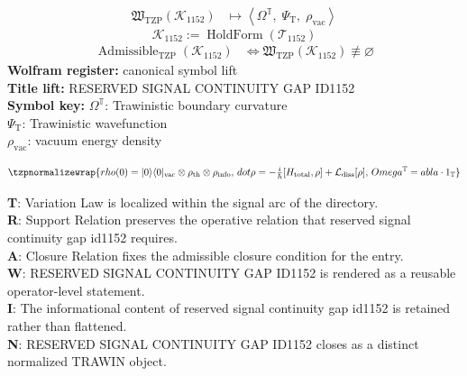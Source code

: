 \noindent
\begin{minipage}[t]{0.48\linewidth}
\begingroup
\small
\[
\begin{aligned}
\mathfrak{W}_{\mathrm{TZP}}\!\left(\mathcal{K}_{1152}\right)
&\longmapsto
\left\langle \Omega^{\mathbb{T}},\; \Psi_{\mathrm{T}},\; \rho_{\mathrm{vac}} \right\rangle
\end{aligned}
\]
\[
\mathcal{K}_{1152}
:=
\operatorname{HoldForm}\!\left(\mathcal{T}_{1152}\right)
\]
\[
\begin{aligned}
\operatorname{Admissible}_{\mathrm{TZP}}\!\left(\mathcal{K}_{1152}\right)
&\Longleftrightarrow
\mathfrak{W}_{\mathrm{TZP}}\!\left(\mathcal{K}_{1152}\right)\not\equiv\varnothing
\end{aligned}
\]
\textbf{Wolfram register:} canonical symbol lift\\
\textbf{Title lift:} RESERVED SIGNAL CONTINUITY GAP ID1152\\
\textbf{Symbol key:} \(\Omega^{\mathbb{T}}\): Trawinistic boundary curvature\\ \(\Psi_{\mathrm{T}}\): Trawinistic wavefunction\\ \(\rho_{\mathrm{vac}}\): vacuum energy density
\par
\endgroup
\end{minipage}\hfill
\begin{minipage}[t]{0.48\linewidth}
\[
\tzpnormalizewrap{rho(0)=|0\rangle\langle0|_{\rm vac}\otimes\rho_{\rm th}\otimes\rho_{\rm info},\,dot\rho = -\tfrac{i}{\hbar}[H_{\rm total},\rho]+\mathcal L_{\rm diss}[\rho],\,Omega^{\mathbb{T}}= abla\cdot1_{\mathbb{T}}}
\]

\small
\textbf{T}: Variation Law is localized within the signal arc of the directory.\\
\textbf{R}: Support Relation preserves the operative relation that reserved signal continuity gap id1152 requires.\\
\textbf{A}: Closure Relation fixes the admissible closure condition for the entry.\\
\textbf{W}: RESERVED SIGNAL CONTINUITY GAP ID1152 is rendered as a reusable operator-level statement.\\
\textbf{I}: The informational content of reserved signal continuity gap id1152 is retained rather than flattened.\\
\textbf{N}: RESERVED SIGNAL CONTINUITY GAP ID1152 closes as a distinct normalized TRAWIN object.
\normalsize
\end{minipage}

